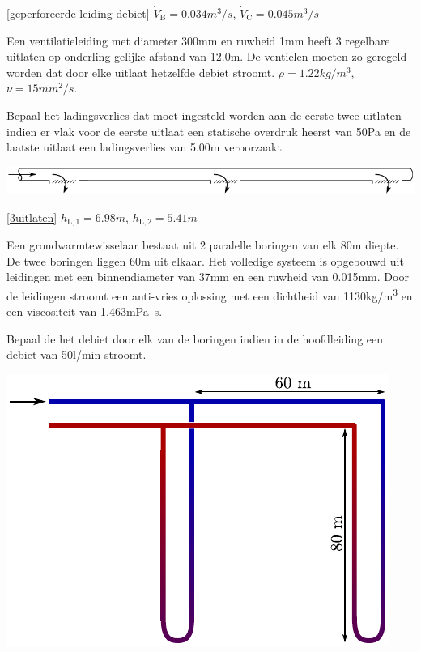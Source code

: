 \begin{antwoord}{\ref{geperforeerde leiding debiet}}
	$\dot{V}_\mathrm{B} = 0.034\unit{m^3/s}$, $\dot{V}_\mathrm{C} = 0.045\unit{m^3/s}$
\end{antwoord}
\begin{toepassing}
	\label{3uitlaten}
Een ventilatieleiding met diameter 300\unit{mm} en ruwheid 1\unit{mm} heeft 3 regelbare uitlaten op onderling gelijke afstand van 12.0\unit{m}. De ventielen moeten zo geregeld worden dat door elke uitlaat hetzelfde debiet stroomt. $\rho = 1.22\unit{kg/m^3}$, $\nu = 15\unit{mm^2/s}$.
	
Bepaal het ladingsverlies dat moet ingesteld worden aan de eerste twee uitlaten indien er vlak voor de eerste uitlaat een statische overdruk heerst van 50\unit{Pa} en de laatste uitlaat een ladingsverlies van 5.00\unit{m} veroorzaakt.

	\centering
	\includegraphics{fig/leidingstelsels/3uitlaten}
\end{toepassing}
\begin{antwoord}{\ref{3uitlaten}}
	$h_\mathrm{L,1} = 6.98\unit{m}$, $h_\mathrm{L,2} = 5.41\unit{m}$
\end{antwoord}
\begin{toepassing}[*]
	\label{grondwarmtewisselaar}
Een grondwarmtewisselaar bestaat uit 2 paralelle boringen van elk 80\unit{m} diepte. De twee boringen liggen 60\unit{m} uit elkaar. Het volledige systeem is opgebouwd uit leidingen met een binnendiameter van 37\unit{mm} en een ruwheid van 0.015\unit{mm}. Door de leidingen stroomt een anti-vries oplossing met een dichtheid van 1130\unit{kg/m^3} en een viscositeit van 1.463\unit{mPa s}.
	
Bepaal de het debiet door elk van de boringen indien in de hoofdleiding een debiet van 50\unit{l/min} stroomt.

	\centering	
	\includegraphics{fig/leidingstelsels/grondwarmtewisselaar}
\end{toepassing}
